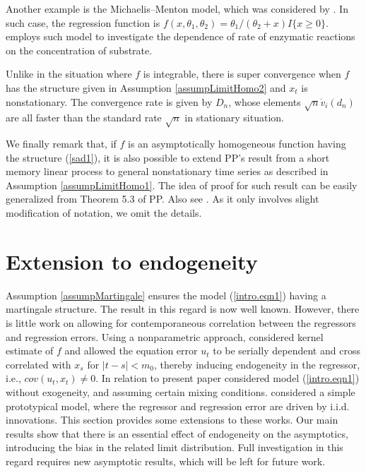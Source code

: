 \begin{rem}
Another example is the Michaelis--Menton model, which was considered by \cite{lai1994}. In such case, the regression function is $f(x, \theta_1, \theta_2) = \theta_1 / (\theta_2 + x) I \{ x \ge 0 \}$. \cite{bateswatts1988} employs such model to investigate the dependence of rate of enzymatic reactions on the concentration of substrate.
\end{rem}

\begin{rem}
Unlike in the situation where $f$ is integrable, there is super convergence when $f$ has the structure given in Assumption \ref{assumpLimitHomo2} and  $x_t$ is nonstationary. The convergence rate is given by $D_n$, whose elements $\sqrt{n} \dot{v}_i(d_n)$ are all faster than the standard rate $\sqrt{n}$ in stationary situation.
\end{rem}

We finally remark that, if  $f$ is an asymptotically homogeneous function
having the structure (\ref {sad1}), it is also possible to extend PP's result from a short memory  linear process to  general nonstationary time series as described  in Assumption \ref{assumpLimitHomo1}. The idea of proof for such result can be easily generalized from Theorem 5.3 of PP. Also see \cite{changparkphillips2001}.  As it only involves slight modification of notation, we omit the details.


\section{Extension to endogeneity } 

Assumption \ref{assumpMartingale} ensures the model (\ref {intro.eqn1}) having a martingale structure.
The result in this regard is now well known. However, there is little work
on allowing for contemporaneous correlation between the regressors and regression errors.
Using a nonparametric approach, \cite{wangphillips2009} considered kernel estimate of $f$ and allowed the equation error $u_t$ to be serially dependent and cross correlated with $x_s$ for $|t-s|<m_0$, thereby inducing endogeneity in the regressor, i.e., $cov (u_t, x_t)\not=0$. In relation to present paper \cite{dejong2002} considered model (\ref{intro.eqn1}) without exogeneity, and assuming certain mixing conditions. \cite{changpark2010} considered a simple prototypical model, where the regressor and regression error are driven by i.i.d. innovations. This section  provides some  extensions to these works. Our main results  show that there is an essential effect of endogeneity on the asymptotics,  introducing the bias in the related limit distribution. Full investigation in this regard requires new asymptotic results, which will be left for future work.


